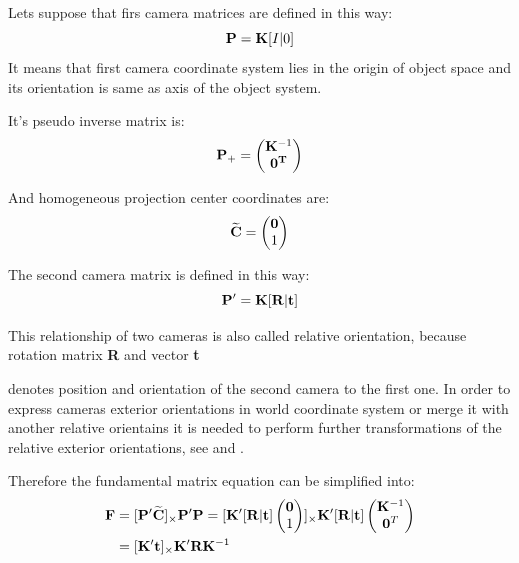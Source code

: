 \documentclass[a4paper,12pt]{report}
\newcommand{\ematr}[1]{
{\bf #1}
}
\newcommand{\evect}[1]{
{\bf #1}
}
\newcommand{\ehvect}[1]{
{\bf \widetilde{#1}}
}
\begin{document}
Lets suppose that firs camera matrices are defined in this way:
\begin{equation}
\label{eq:rel_or_cam1}
\ematr{P}  = \ematr{K} \ematr{[}I|0\ematr{]}
\end{equation}
It means that first camera coordinate system lies in the origin of object space and its orientation is same
as axis of the object system.

It's pseudo inverse matrix is:
\begin{equation}
\ematr{P}_{+} =
\begin{pmatrix}
   \ematr{K}^{-1} \\
   \evect{0^{T}} \\
\end{pmatrix}
\end{equation}

And homogeneous projection center coordinates are:
\begin{equation}
\ehvect{C} =
\begin{pmatrix}
   \evect{0} \\
    1 \\
\end{pmatrix}
\end{equation}


The second camera matrix is defined in this way:
\begin{equation}
\label{eq:rel_or_cam2}
\ematr{P}'  = \ematr{K} \ematr{[}\ematr{R}|\evect{t}\ematr{]}
\end{equation}

This relationship of two cameras is also called relative orientation, because rotation matrix \ematr{R} and vector \evect{t}
denotes position and orientation of the second camera to the first one. In order to express cameras exterior orientations in world coordinate 
system or merge it with another relative orientains it is needed to perform further transformations of the relative 
exterior orientations, see \label{sec:ess_chain} and \label{sec:helmert}.

Therefore the fundamental matrix equation can be simplified into:
\begin{equation}
\begin{split}
\ematr{F}  &= [\ematr{P}'\ehvect{C}]_{\times} \ematr{P}'\ematr{P} 
= [\ematr{K}' [\ematr{R}|\evect{t}]
\begin{pmatrix}
   \evect{0} \\
    1 \\
\end{pmatrix}]
_{\times} 
\ematr{K}' [\ematr{R}|\evect{t}]  
\begin{pmatrix}
   \evect{K}^{-1} \\
   \evect{0}^{T} \\
\end{pmatrix} \\
&= [\ematr{K}' \evect{t}]_{\times} \ematr{K}'\ematr{R}\ematr{K}^{-1} 
\end{split}
\end{equation}
\end{document}

